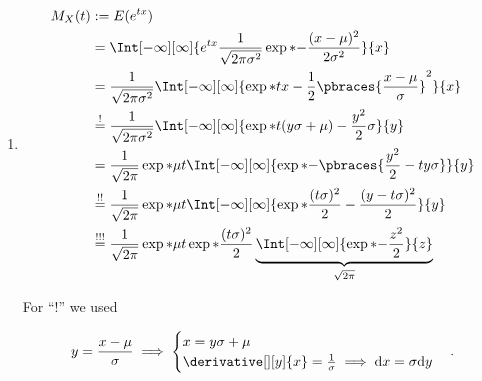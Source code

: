\begin{solution}

\phantom{}

\begin{enumerate}[label = (\alph*)]

    \item

    \begin{align*}
        M_X(t)
        & :=
        E(e^{t x}) \\
        & =
        \Int[-\infty][\infty]
        {
            e^{t x}
            \frac{1}{\sqrt{2 \pi \sigma^2}}
            \exp*{-\frac{(x - \mu)^2}{2 \sigma^2}}
        }{x} \\
        & =
        \frac{1}{\sqrt{2 \pi \sigma^2}}
        \Int[-\infty][\infty]
        {
            \exp*
            {
                t x
                -
                \frac{1}{2} \pbraces{\frac{x - \mu}{\sigma}}^2
            }
        }{x} \\
        & \stackrel{!}{=}
        \frac{1}{\sqrt{2 \pi \sigma^2}}
        \Int[-\infty][\infty]
        {
            \exp*
            {
                t (y \sigma + \mu)
                -
                \frac{y^2}{2}
            }
            \sigma
        }{y} \\
        & =
        \frac{1}{\sqrt{2 \pi}}
        \exp*{\mu t}
        \Int[-\infty][\infty]
        {
            \exp*{-\pbraces{\frac{y^2}{2} - t y \sigma}}
        }{y} \\
        & \stackrel{!!}{=}
        \frac{1}{\sqrt{2 \pi}}
        \exp*{\mu t}
        \Int[-\infty][\infty]
        {
            \exp*
            {
                \frac{(t \sigma)^2}{2}
                -
                \frac{(y - t \sigma)^2}{2}
            }
        }{y} \\
        & \stackrel{!!!}{=}
        \frac{1}{\sqrt{2 \pi}}
        \exp*{\mu t}
        \exp*{\frac{(t \sigma)^2}{2}}
        \underbrace
        {
            \Int[-\infty][\infty]
            {
                \exp*{-\frac{z^2}{2}}
            }{z}
        }_{
            \sqrt{2 \pi}
        }
        \end{align*}

        For \enquote{!} we used

        \begin{align*}
            y = \frac{x - \mu}{\sigma}
            \implies
            \begin{cases}
                x = y \sigma + \mu \\
                \derivative[][y]{x} = \frac{1}{\sigma} \implies \mathrm d x = \sigma \mathrm d y
            \end{cases}.
        \end{align*}


\end{enumerate}
\end{solution}
